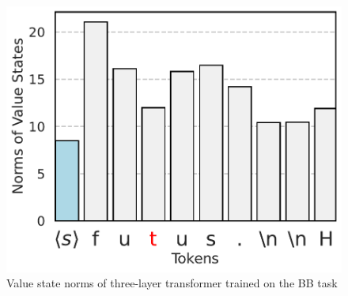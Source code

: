 \begin{figure}[t]
\begin{minipage}{0.3\textwidth}
  \end{minipage}
  \begin{minipage}{0.3\textwidth}
      \centering
      \vspace{-.2em}
      \includegraphics[width=\linewidth]{Figures/BBM_appendix/value_states_layer_2.pdf}
  \end{minipage}
  \caption{\small Value state norms of three-layer transformer trained on the BB task}
  \label{appfigure:massive-value-norm}
  \vspace{-1em}
\end{figure}


